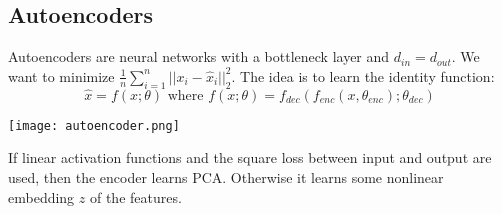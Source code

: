 \subsection{Autoencoders}

Autoencoders are neural networks with a bottleneck layer and $d_{in} = d_{out}$. We want to minimize $\frac{1}{n}\sum_{i=1}^n ||x_i - \hat{x}_i||_2^2$. The idea is to learn the identity function:
$$\hat{x} = f(x; \theta) \text{ where } f(x; \theta) = f_{dec}(f_{enc}(x, \theta_{enc}); \theta_{dec})$$

\texttt{[image: autoencoder.png]}

If linear activation functions and the square loss between input and output are used, then the encoder learns PCA. Otherwise it learns some nonlinear embedding $z$ of the features.